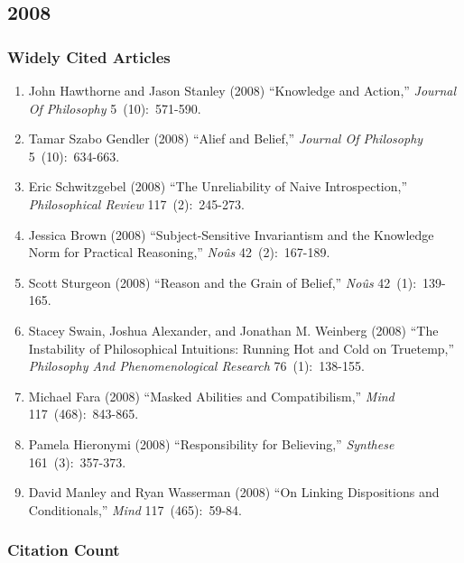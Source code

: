 \documentclass[
  10pt,
  letterpaper,
  DIV=11,
  numbers=noendperiod,
  twoside]{scrartcl}
\providecommand{\tightlist}{%
  \setlength{\itemsep}{0pt}\setlength{\parskip}{0pt}}\usepackage{longtable,booktabs,array}
\begin{document}
\newpage

\subsection{2008}\label{sec-s2008}

\subsubsection*{Widely Cited Articles}\label{widely-cited-articles-51}

\begin{enumerate}
\def\labelenumi{\arabic{enumi}.}
\tightlist
\item
  John Hawthorne and Jason Stanley (2008) ``Knowledge and Action,''
  \emph{Journal Of Philosophy} 5~(10):~571-590.
\item
  Tamar Szabo Gendler (2008) ``Alief and Belief,'' \emph{Journal Of
  Philosophy} 5~(10):~634-663.
\item
  Eric Schwitzgebel (2008) ``The Unreliability of Naive Introspection,''
  \emph{Philosophical Review} 117~(2):~245-273.
\item
  Jessica Brown (2008) ``Subject-Sensitive Invariantism and the
  Knowledge Norm for Practical Reasoning,'' \emph{Noûs} 42~(2):~167-189.
\item
  Scott Sturgeon (2008) ``Reason and the Grain of Belief,'' \emph{Noûs}
  42~(1):~139-165.
\item
  Stacey Swain, Joshua Alexander, and Jonathan M. Weinberg (2008) ``The
  Instability of Philosophical Intuitions: Running Hot and Cold on
  Truetemp,'' \emph{Philosophy And Phenomenological Research}
  76~(1):~138-155.
\item
  Michael Fara (2008) ``Masked Abilities and Compatibilism,''
  \emph{Mind} 117~(468):~843-865.
\item
  Pamela Hieronymi (2008) ``Responsibility for Believing,''
  \emph{Synthese} 161~(3):~357-373.
\item
  David Manley and Ryan Wasserman (2008) ``On Linking Dispositions and
  Conditionals,'' \emph{Mind} 117~(465):~59-84.
\end{enumerate}

\subsubsection*{Citation Count}\label{sec-count-2008}
\end{document}
